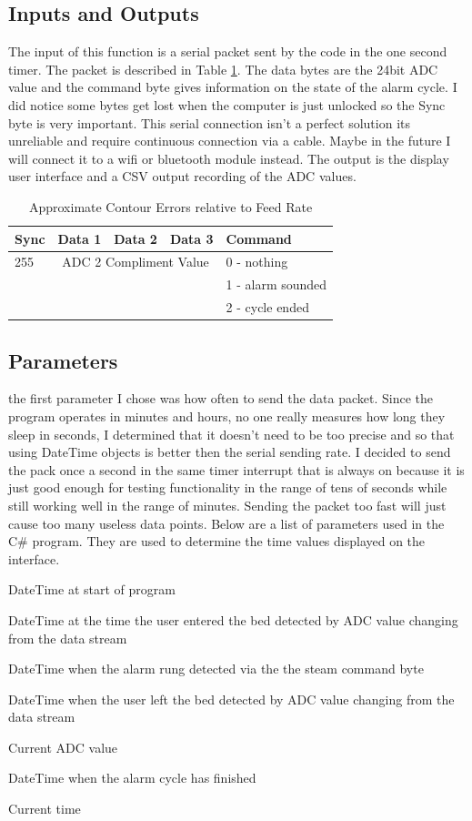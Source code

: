 \documentclass[11pt]{article}
\begin{document}
\subsection*{Inputs and Outputs}
The input of this function is a serial packet sent by the code in the one second timer. 
The packet is described in Table \ref{tab:packet}.
The data bytes are the 24bit ADC value and the command byte gives information on the state of the alarm cycle. 
I did notice some bytes get lost when the computer is just unlocked so the Sync byte is very important.
This serial connection isn't a perfect solution its unreliable and require continuous connection via a cable. 
Maybe in the future I will connect it to a wifi or bluetooth module instead.
The output is the display user interface and a CSV output recording of the ADC values. 
\begin{table}[H]
	\centering
	\caption{Approximate Contour Errors relative to Feed Rate}
	\label{tab:packet}
	\begin{tabular}{|l|l|l|l|l|}
		\hline
		Sync  & Data 1 & Data 2 & Data 3 &Command \\
		\hline
		255 &  \multicolumn{3}{c|}{ADC 2 Compliment Value}  & 0 - nothing  \\
		 &  \multicolumn{3}{c|}{}  & 	1 - alarm sounded \\
		 &  \multicolumn{3}{c|}{}  &	2 - cycle ended \\
		\hline	
	\end{tabular}
\end{table}
\subsection*{Parameters}
the first parameter I chose was how often to send the data packet.
Since the program operates in minutes and hours, no one really measures how long they sleep in seconds, I determined that it doesn't need to be too precise and so that using DateTime objects is better then the serial sending rate.    
I decided to send the pack once a second in the same timer interrupt that is always on because it is just good enough for testing functionality in the range of tens of seconds while still working well in the range of minutes. 
Sending the packet too fast will just cause too many useless data points.
Below are a list of parameters used in the C\# program. 
They are used to determine the time values displayed on the interface. 
\begin{itemeize}
	\item DateTime at start of program
	\item DateTime at the time the user entered the bed detected by ADC value changing from the data stream
	\item DateTime when the alarm rung detected via the the steam command byte
	\item DateTime when the user left the bed detected by ADC value changing from the data stream
	\item Current ADC value 
	\item DateTime when the alarm cycle has finished
	\item Current time
\end{itemeize}
\end{document}
